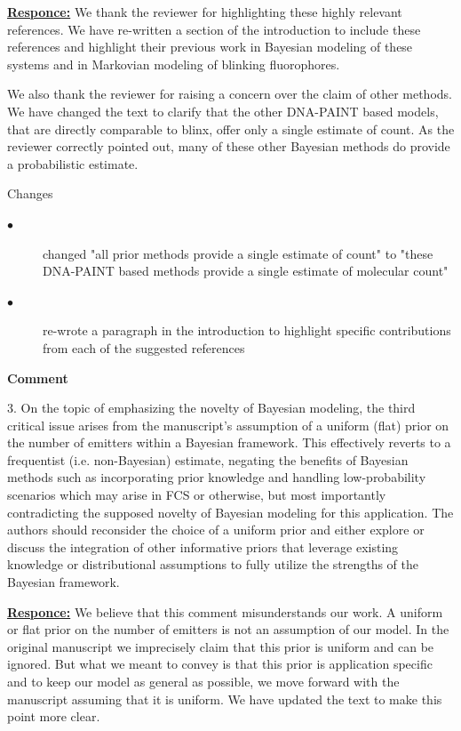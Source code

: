 \documentclass{article}
\begin{document}
\underline{\textbf{Responce:}}
We thank the reviewer for highlighting these highly relevant references. We have re-written a section of 
the introduction to include these references and highlight their previous work in Bayesian modeling of 
these systems and in Markovian modeling of blinking fluorophores.

We also thank the reviewer for raising a concern over the claim of other methods. We have changed the text to 
clarify that the other DNA-PAINT based models, that are directly comparable to blinx, offer only a single estimate 
of count. As the reviewer correctly pointed out, many of these other Bayesian methods do provide a probabilistic 
estimate.

Changes
\begin{description}
    \item[$\bullet$] changed "all prior methods provide a single estimate of count" to 
    "these DNA-PAINT based methods provide a single estimate of molecular count"
    \item[$\bullet$] re-wrote a paragraph in the introduction to highlight specific contributions from 
    each of the suggested references
\end{description}

\textbf{Comment}

3.	On the topic of emphasizing the novelty of Bayesian modeling, 
the third critical issue arises from the manuscript's assumption of a uniform (flat) 
prior on the number of emitters within a Bayesian framework. 
This effectively reverts to a frequentist (i.e. non-Bayesian) estimate, 
negating the benefits of Bayesian methods such as incorporating prior knowledge 
and handling low-probability scenarios which may arise in FCS or otherwise, 
but most importantly contradicting the supposed novelty of Bayesian modeling for this application. 
The authors should reconsider the choice of a uniform prior and either explore or discuss 
the integration of other informative priors that leverage existing knowledge or distributional 
assumptions to fully utilize the strengths of the Bayesian framework.

\underline{\textbf{Responce:}}
We believe that this comment misunderstands our work. A uniform or flat prior on the number of emitters is 
not an assumption of our model. In the original manuscript we imprecisely claim that this prior is uniform and 
can be ignored. But what we meant to convey is that this prior is application specific and to keep our model as 
general as possible, we move forward with the manuscript assuming that it is uniform. We have updated the text to make 
this point more clear. 
\end{document}
